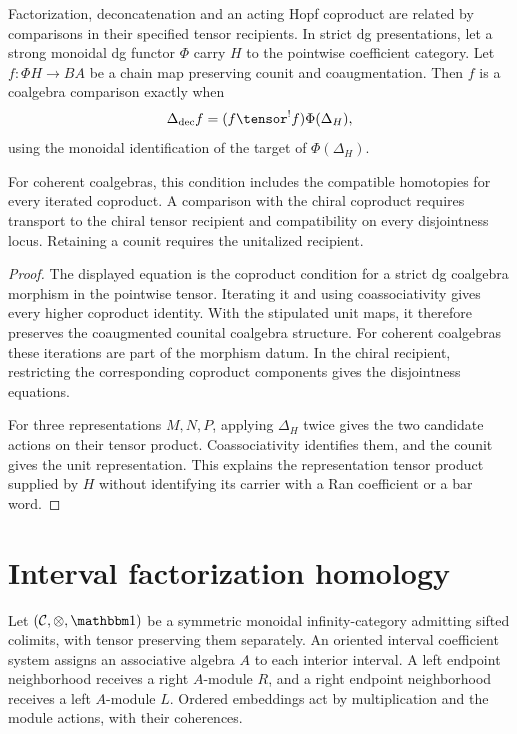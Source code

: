 \begin{proposition}\label{cbc:internal:three-coproducts}
Factorization, deconcatenation and an acting Hopf coproduct are related by comparisons in their specified tensor recipients. In strict dg presentations, let a strong monoidal dg functor $\Phi$ carry $H$ to the pointwise coefficient category. Let $f:\Phi H\to BA$ be a chain map preserving counit and coaugmentation. Then $f$ is a coalgebra comparison exactly when
\[
 \Delta_{\mathrm{dec}}f
   =(f\tensor^!f)\Phi(\Delta_H),
\]
using the monoidal identification of the target of $\Phi(\Delta_H)$.

For coherent coalgebras, this condition includes the compatible homotopies for every iterated coproduct. A comparison with the chiral coproduct requires transport to the chiral tensor recipient and compatibility on every disjointness locus. Retaining a counit requires the unitalized recipient.
\end{proposition}
\begin{proof}
The displayed equation is the coproduct condition for a strict dg coalgebra morphism in the pointwise tensor. Iterating it and using coassociativity gives every higher coproduct identity. With the stipulated unit maps, it therefore preserves the coaugmented counital coalgebra structure. For coherent coalgebras these iterations are part of the morphism datum. In the chiral recipient, restricting the corresponding coproduct components gives the disjointness equations.

For three representations $M,N,P$, applying $\Delta_H$ twice gives the two candidate actions on their tensor product. Coassociativity identifies them, and the counit gives the unit representation. This explains the representation tensor product supplied by $H$ without identifying its carrier with a Ran coefficient or a bar word.
\end{proof}

\section{Interval factorization homology}
Let $(\mathcal C,\otimes,\mathbbm1)$ be a symmetric monoidal infinity-category admitting sifted colimits, with tensor preserving them separately. An oriented interval coefficient system assigns an associative algebra $A$ to each interior interval. A left endpoint neighborhood receives a right $A$-module $R$, and a right endpoint neighborhood receives a left $A$-module $L$. Ordered embeddings act by multiplication and the module actions, with their coherences.

